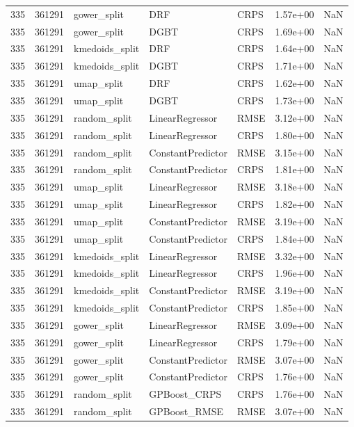 \begin{tabular}{rrlllrr}
335 & 361291 & gower\_split & DRF & CRPS & 1.57e+00 & NaN \\
335 & 361291 & gower\_split & DGBT & CRPS & 1.69e+00 & NaN \\
335 & 361291 & kmedoids\_split & DRF & CRPS & 1.64e+00 & NaN \\
335 & 361291 & kmedoids\_split & DGBT & CRPS & 1.71e+00 & NaN \\
335 & 361291 & umap\_split & DRF & CRPS & 1.62e+00 & NaN \\
335 & 361291 & umap\_split & DGBT & CRPS & 1.73e+00 & NaN \\
335 & 361291 & random\_split & LinearRegressor & RMSE & 3.12e+00 & NaN \\
335 & 361291 & random\_split & LinearRegressor & CRPS & 1.80e+00 & NaN \\
335 & 361291 & random\_split & ConstantPredictor & RMSE & 3.15e+00 & NaN \\
335 & 361291 & random\_split & ConstantPredictor & CRPS & 1.81e+00 & NaN \\
335 & 361291 & umap\_split & LinearRegressor & RMSE & 3.18e+00 & NaN \\
335 & 361291 & umap\_split & LinearRegressor & CRPS & 1.82e+00 & NaN \\
335 & 361291 & umap\_split & ConstantPredictor & RMSE & 3.19e+00 & NaN \\
335 & 361291 & umap\_split & ConstantPredictor & CRPS & 1.84e+00 & NaN \\
335 & 361291 & kmedoids\_split & LinearRegressor & RMSE & 3.32e+00 & NaN \\
335 & 361291 & kmedoids\_split & LinearRegressor & CRPS & 1.96e+00 & NaN \\
335 & 361291 & kmedoids\_split & ConstantPredictor & RMSE & 3.19e+00 & NaN \\
335 & 361291 & kmedoids\_split & ConstantPredictor & CRPS & 1.85e+00 & NaN \\
335 & 361291 & gower\_split & LinearRegressor & RMSE & 3.09e+00 & NaN \\
335 & 361291 & gower\_split & LinearRegressor & CRPS & 1.79e+00 & NaN \\
335 & 361291 & gower\_split & ConstantPredictor & RMSE & 3.07e+00 & NaN \\
335 & 361291 & gower\_split & ConstantPredictor & CRPS & 1.76e+00 & NaN \\
335 & 361291 & random\_split & GPBoost\_CRPS & CRPS & 1.76e+00 & NaN \\
335 & 361291 & random\_split & GPBoost\_RMSE & RMSE & 3.07e+00 & NaN \\

\end{tabular}
